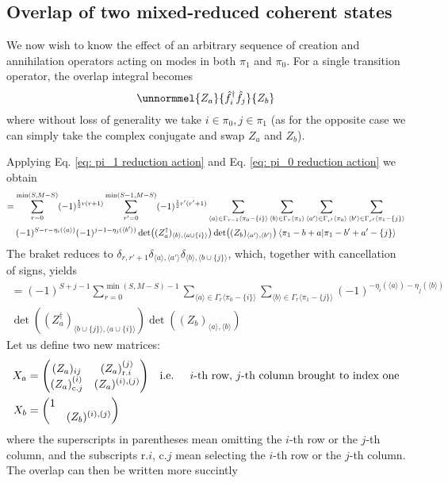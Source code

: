 \documentclass[12pt]{article}
\newcommand{\seq}[1]{\langle #1\rangle}
\newcommand{\hc}{^\dagger}
\begin{document}
	\subsection{Overlap of two mixed-reduced coherent states}
	We now wish to know the effect of an arbitrary sequence of creation and annihilation operators acting on modes in both $\pi_1$ and $\pi_0$. For a single transition operator, the overlap integral becomes
	\begin{equation} \label{eq: overlap of two mixed reduced coherent states problem}
	\unnormmel{Z_a}{\hat{f}\hc_i\hat{f}_j}{Z_b}
	\end{equation}
	where without loss of generality we take $i\in\pi_0, j\in\pi_1$ (as for the opposite case we can simply take the complex conjugate and swap $Z_a$ and $Z_b$).
	
	Applying Eq. \ref{eq: pi_1 reduction action} and Eq. \ref{eq: pi_0 reduction action} we obtain
	\begin{multline}
	= \sum_{r=0}^{\min(S,M-S)}(-1)^{\frac{1}{2}r(r+1)}\sum_{r'=0}^{\min(S-1,M-S)}(-1)^{\frac{1}{2}r'(r'+1)}\sum_{\seq{a}\in\Gamma_{r-1}\seq{\pi_0-\{i\}}}\sum_{\seq{b}\in\Gamma_{r}\seq{\pi_1}}\sum_{\seq{a'}\in\Gamma_{r'}\seq{\pi_0}}\sum_{\seq{b'}\in\Gamma_{r'}\seq{\pi_1-\{j\}}}\\
	(-1)^{S-r-\eta_i(\seq{a})}(-1)^{j-1-\eta_j(\seq{b'})}\det((Z_a\hc)_{\seq{b},\seq{a\cup\{i\}}})\det((Z_b)_{\seq{a'},\seq{b'}})\braket{\pi_1-b+a}{\pi_1-b'+a'-\{j\}}
	\end{multline}
	The braket reduces to $\delta_{r,r'+1}\delta_{\seq{a},\seq{a'}}\delta_{\seq{b},\seq{b\cup\{j\}}}$, which, together with cancellation of signs, yields
	\begin{multline}
	=(-1)^{S+j-1}\sum_{r=0}^{\min(S, M-S)-1}\sum_{\seq{a}\in\Gamma_{r}\seq{\pi_0-\{i\}}}\sum_{\seq{b}\in\Gamma_{r}\seq{\pi_1-\{j\}}}(-1)^{-\eta_i(\seq{a})-\eta_j(\seq{b})}\\
	\det((Z_a\hc)_{\seq{b\cup\{j\}},\seq{a\cup\{i\}}})\det((Z_b)_{\seq{a},\seq{b}})
	\end{multline}
	Let us define two new matrices:
	\begin{align}
	X_a&=\mqty(
		(Z_a)_{ij} & (Z_a)^{(j)}_{\text{r.} i}\\
		(Z_a)^{(i)}_{\text{c.} j} & (Z_a)^{(i),(j)}
	) \qq{i.e. }i\text{-th row, }j\text{-th column brought to index one}\\
	X_b &= \mqty(\dmat{1, (Z_b)^{(i),(j)}})
	\end{align}
	where the superscripts in parentheses mean omitting the $i$-th row or the $j$-th column, and the subscripts r.$i$, c.$j$ mean selecting the $i$-th row or the $j$-th column. The overlap can then be written more succintly
\end{document}
